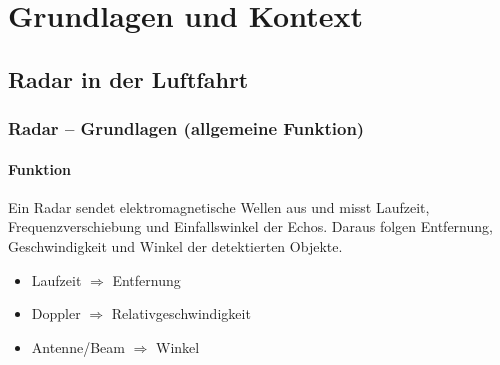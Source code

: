 \part{Grundlagen und Kontext}
\chapter{Radar in der Luftfahrt}

\usetikzlibrary{arrows.meta, positioning}

\section{Radar – Grundlagen (allgemeine Funktion)}

\subsection{Funktion}
Ein Radar sendet elektromagnetische Wellen aus und misst Laufzeit,
Frequenzverschiebung und Einfallswinkel der Echos.
Daraus folgen Entfernung, Geschwindigkeit und Winkel der detektierten Objekte.
\begin{itemize}
  \item Laufzeit $\Rightarrow$ Entfernung
  \item Doppler $\Rightarrow$ Relativgeschwindigkeit
  \item Antenne/Beam $\Rightarrow$ Winkel
\end{itemize}

